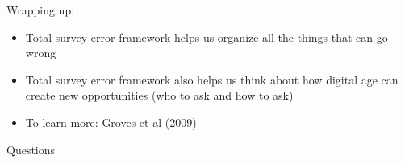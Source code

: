 \documentclass[aspectratio=169]{beamer}
\begin{document}
\begin{frame}

Wrapping up:
\pause
\begin{itemize}
\item Total survey error framework helps us organize all the things that can go wrong
\pause
\item Total survey error framework also helps us think about how digital age can create new opportunities (who to ask and how to ask)
\pause 
\item To learn more: \href{https://www.amazon.com/Survey-Methodology-Robert-M-Groves/dp/0470465468}{Groves et al (2009)}
\end{itemize}

\end{frame}
\begin{frame}

\begin{center}
\Large Questions
\end{center}

\end{frame}
\end{document}

